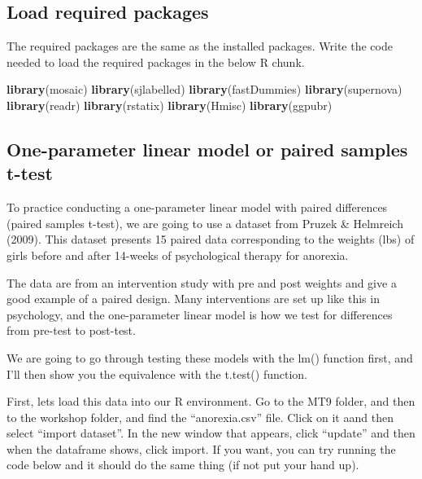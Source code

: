 \documentclass[
]{article}
\newenvironment{Shaded}{\begin{snugshade}}{\end{snugshade}}
\newcommand{\FunctionTok}[1]{\textcolor[rgb]{0.13,0.29,0.53}{\textbf{#1}}}
\newcommand{\NormalTok}[1]{#1}
\begin{document}
\subsection{Load required packages}\label{load-required-packages}

The required packages are the same as the installed packages. Write the
code needed to load the required packages in the below R chunk.

\begin{Shaded}
\begin{Highlighting}[]
\FunctionTok{library}\NormalTok{(mosaic)}
\FunctionTok{library}\NormalTok{(sjlabelled)}
\FunctionTok{library}\NormalTok{(fastDummies)}
\FunctionTok{library}\NormalTok{(supernova)}
\FunctionTok{library}\NormalTok{(readr)}
\FunctionTok{library}\NormalTok{(rstatix)}
\FunctionTok{library}\NormalTok{(Hmisc)}
\FunctionTok{library}\NormalTok{(ggpubr)}
\end{Highlighting}
\end{Shaded}

\subsection{One-parameter linear model or paired samples
t-test}\label{one-parameter-linear-model-or-paired-samples-t-test}

To practice conducting a one-parameter linear model with paired
differences (paired samples t-test), we are going to use a dataset from
Pruzek \& Helmreich (2009). This dataset presents 15 paired data
corresponding to the weights (lbs) of girls before and after 14-weeks of
psychological therapy for anorexia.

The data are from an intervention study with pre and post weights and
give a good example of a paired design. Many interventions are set up
like this in psychology, and the one-parameter linear model is how we
test for differences from pre-test to post-test.

We are going to go through testing these models with the lm() function
first, and I'll then show you the equivalence with the t.test()
function.

First, lets load this data into our R environment. Go to the MT9 folder,
and then to the workshop folder, and find the ``anorexia.csv'' file.
Click on it aand then select ``import dataset''. In the new window that
appears, click ``update'' and then when the dataframe shows, click
import. If you want, you can try running the code below and it should do
the same thing (if not put your hand up).
\end{document}
